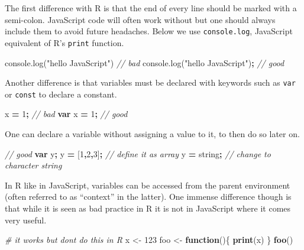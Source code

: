 \documentclass[
]{krantz}
\makeatletter
\newenvironment{Shaded}{\begin{snugshade}}{\end{snugshade}}
\newcommand{\AttributeTok}[1]{\textcolor[rgb]{0.61,0.61,0.61}{#1}}
\newcommand{\CommentTok}[1]{\textcolor[rgb]{0.37,0.37,0.37}{\textit{#1}}}
\newcommand{\ControlFlowTok}[1]{\textcolor[rgb]{0.27,0.27,0.27}{\textbf{#1}}}
\newcommand{\DecValTok}[1]{\textcolor[rgb]{0.06,0.06,0.06}{#1}}
\newcommand{\KeywordTok}[1]{\textcolor[rgb]{0.27,0.27,0.27}{\textbf{#1}}}
\newcommand{\NormalTok}[1]{#1}
\newcommand{\OperatorTok}[1]{\textcolor[rgb]{0.43,0.43,0.43}{\textbf{#1}}}
\newcommand{\StringTok}[1]{\textcolor[rgb]{0.5,0.5,0.5}{#1}}
\newcommand{\VariableTok}[1]{\textcolor[rgb]{0,0,0}{#1}}
\newenvironment{kframe}{%
\medskip{}
\setlength{\fboxsep}{.8em}
 \def\at@end@of@kframe{}%
 \ifinner\ifhmode%
  \def\at@end@of@kframe{\end{minipage}}%
  \begin{minipage}{\columnwidth}%
 \fi\fi%
 \def\FrameCommand##1{\hskip\@totalleftmargin \hskip-\fboxsep
 \colorbox{shadecolor}{##1}\hskip-\fboxsep
     \hskip-\linewidth \hskip-\@totalleftmargin \hskip\columnwidth}%
 \MakeFramed {\advance\hsize-\width
   \@totalleftmargin\z@ \linewidth\hsize
   \@setminipage}}%
 {\par\unskip\endMakeFramed%
 \at@end@of@kframe}
\renewenvironment{Shaded}{\begin{kframe}}{\end{kframe}}
\makeatother
\begin{document}
The first difference with R is that the end of every line should be marked with a semi-colon. JavaScript code will often work without but one should always include them to avoid future headaches. Below we use \texttt{console.log}, JavaScript equivalent of R's \texttt{print} function.

\begin{Shaded}
\begin{Highlighting}[]
\VariableTok{console}\NormalTok{.}\AttributeTok{log}\NormalTok{(}\StringTok{"hello JavaScript"}\NormalTok{) }\CommentTok{// bad}
\VariableTok{console}\NormalTok{.}\AttributeTok{log}\NormalTok{(}\StringTok{"hello JavaScript"}\NormalTok{)}\OperatorTok{;} \CommentTok{// good}
\end{Highlighting}
\end{Shaded}

Another difference is that variables must be declared with keywords such as \texttt{var} or \texttt{const} to declare a constant.

\begin{Shaded}
\begin{Highlighting}[]
\NormalTok{x }\OperatorTok{=} \DecValTok{1}\OperatorTok{;} \CommentTok{// bad}
\KeywordTok{var}\NormalTok{ x }\OperatorTok{=} \DecValTok{1}\OperatorTok{;} \CommentTok{// good}
\end{Highlighting}
\end{Shaded}

One can declare a variable without assigning a value to it, to then do so later on.

\begin{Shaded}
\begin{Highlighting}[]
\CommentTok{// good}
\KeywordTok{var}\NormalTok{ y}\OperatorTok{;} 
\NormalTok{y }\OperatorTok{=}\NormalTok{ [}\DecValTok{1}\OperatorTok{,}\DecValTok{2}\OperatorTok{,}\DecValTok{3}\NormalTok{]}\OperatorTok{;} \CommentTok{// define it as array}
\NormalTok{y }\OperatorTok{=} \StringTok{\textquotesingle{}string\textquotesingle{}}\OperatorTok{;} \CommentTok{// change to character string}
\end{Highlighting}
\end{Shaded}

In R like in JavaScript, variables can be accessed from the parent environment (often referred to as ``context'' in the latter). One immense difference though is that while it is seen as bad practice in R it is not in JavaScript where it comes very useful.

\begin{Shaded}
\begin{Highlighting}[]
\CommentTok{\# it works but don\textquotesingle{}t do this in R}
\NormalTok{x <{-}}\StringTok{ }\DecValTok{123}
\NormalTok{foo <{-}}\StringTok{ }\ControlFlowTok{function}\NormalTok{()\{}
  \KeywordTok{print}\NormalTok{(x)}
\NormalTok{\}}
\KeywordTok{foo}\NormalTok{()}
\end{Highlighting}
\end{Shaded}
\end{document}
